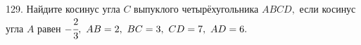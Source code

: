 129. Найдите косинус угла $C$ выпуклого четырёхугольника $ABCD,$ если косинус угла $A$ равен $-\cfrac{2}{3},\ AB=2,\ BC=3,\ CD=7,\ AD=6.$\\
